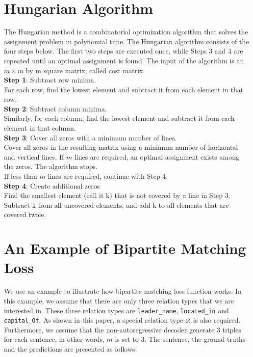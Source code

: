 \documentclass[letterpaper]{article} \usepackage{aaai21}  \usepackage{times}  \usepackage{helvet} \usepackage{courier}  \usepackage[hyphens]{url}  \usepackage{graphicx} \usepackage{amsfonts,amssymb}
\begin{document}



\section{Hungarian Algorithm}

The Hungarian method is a combinatorial optimization algorithm that solves the assignment problem in polynomial time. The Hungarian algorithm consists of the four steps below. The first two steps are executed once, while Steps 3 and 4 are repeated until an optimal assignment is found. The input of the algorithm is an $m \times m$ by m square matrix, called cost matrix.
\\

\noindent \textbf{Step 1}: Subtract row minima. \\

\noindent For each row, find the lowest element and subtract it from each element in that row.\\

\noindent \textbf{Step 2}: Subtract column minima.  \\

\noindent Similarly, for each column, find the lowest element and subtract it from each element in that column. \\

\noindent \textbf{Step 3}: Cover all zeros with a minimum number of lines.\\

\noindent Cover all zeros in the resulting matrix using a minimum number of horizontal and vertical lines. If $m$ lines are required, an optimal assignment exists among the zeros. The algorithm stops. \\

\noindent If less than $m$ lines are required, continue with Step 4.\\

\noindent \textbf{Step 4}: Create additional zeros
\\

\noindent  Find the smallest element (call it k) that is not covered by a line in Step 3. Subtract k from all uncovered elements, and add k to all elements that are covered twice.

\section{An Example of Bipartite Matching Loss}
We use an example to illustrate how bipartite matching loss function works. In this example, we assume that there are only three relation types that we are interested in. These three relation types are \texttt{leader\_name}, \texttt{located\_in} and \texttt{capital\_Of}. As shown in this paper, a special relation type $\varnothing$ is also required. Furthermore, we assume that the non-autoregressive decoder generate 3 triples for each sentence, in other words, $m$ is set to 3. The sentence, the ground-truths 
and the predictions are presented as follows:
\end{document}
